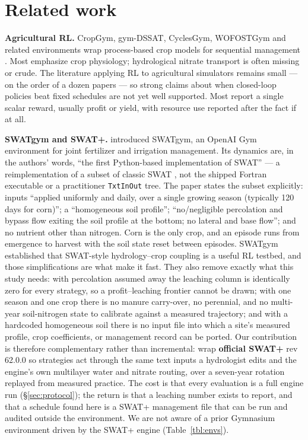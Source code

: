 \documentclass[a4paper,fleqn]{cas-sc}
\begin{document}
\section{Related work}\label{sec:related}

\textbf{Agricultural RL.} CropGym, gym-DSSAT, CyclesGym, WOFOSTGym and related
environments wrap process-based crop models for sequential management
\citep{overweg2021, gautron2022, turchetta2022}. Most emphasize crop physiology;
hydrological nitrate transport is often missing or crude. The literature applying RL to
agricultural simulators remains small --- on the order of a dozen papers --- so strong
claims about when closed-loop policies beat fixed schedules are not yet well supported.
Most report a single scalar reward, usually profit or yield, with resource use reported
after the fact if at all.

\textbf{SWATgym and SWAT+.} \citet{madondo2023} introduced SWATgym, an OpenAI Gym
environment for joint fertilizer and irrigation management. Its dynamics are, in the
authors' words, ``the first Python-based implementation of SWAT'' --- a
reimplementation of a subset of classic SWAT \citep{arnold2012}, not the shipped Fortran
executable or a practitioner \texttt{TxtInOut} tree. The paper states the subset
explicitly: inputs ``applied uniformly and daily, over a single growing season
(typically 120 days for corn)''; a ``homogeneous soil profile''; ``no/negligible
percolation and bypass flow exiting the soil profile at the bottom; no lateral and base
flow''; and no nutrient other than nitrogen. Corn is the only crop, and an episode runs
from emergence to harvest with the soil state reset between episodes. SWATgym established
that SWAT-style hydrology--crop coupling is a useful RL testbed, and those simplifications
are what make it fast. They also remove exactly what this study needs: with percolation
assumed away the leaching column is identically zero for every strategy, so a
profit--leaching frontier cannot be drawn; with one season and one crop there is no
manure carry-over, no perennial, and no multi-year soil-nitrogen state to calibrate
against a measured trajectory; and with a hardcoded homogeneous soil there is no input
file into which a site's measured profile, crop coefficients, or management record can be
ported. Our contribution is therefore complementary rather than incremental: wrap
\textbf{official SWAT+} rev 62.0.0 so strategies act through the same text inputs a
hydrologist edits and the engine's own multilayer water and nitrate routing, over a
seven-year rotation replayed from measured practice. The cost is that every evaluation
is a full engine run (\S\ref{sec:protocol}); the return is that a leaching number exists
to report, and that a schedule found here is a SWAT+ management file that can be run
and audited outside the environment. We are not aware of a prior Gymnasium environment
driven by the SWAT+ engine (Table~\ref{tbl:envs}).
\end{document}
